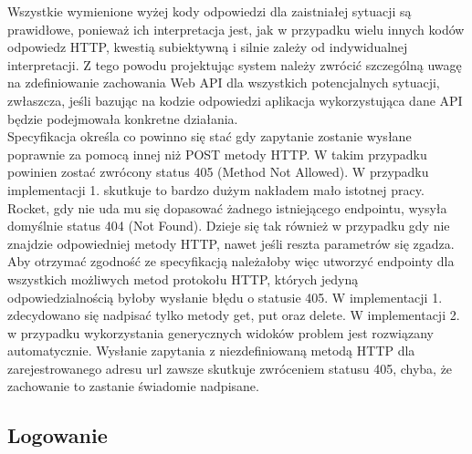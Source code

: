 \documentclass[12pt, notitlepage]{article}
\begin{document}
Wszystkie wymienione wyżej kody odpowiedzi dla zaistniałej sytuacji są prawidłowe, ponieważ ich interpretacja jest, jak w przypadku wielu innych kodów odpowiedz HTTP, kwestią subiektywną i silnie zależy od indywidualnej interpretacji. Z tego powodu projektując system należy zwrócić szczególną uwagę na zdefiniowanie zachowania Web API dla wszystkich potencjalnych sytuacji, zwłaszcza, jeśli bazując na kodzie odpowiedzi aplikacja wykorzystująca dane API będzie podejmowała konkretne działania. \\
Specyfikacja określa co powinno się stać gdy zapytanie zostanie wysłane poprawnie za pomocą innej niż POST metody HTTP. W takim przypadku powinien zostać zwrócony status 405 (Method Not Allowed). W przypadku implementacji 1. skutkuje to bardzo dużym nakładem mało istotnej pracy. Rocket, gdy nie uda mu się dopasować żadnego istniejącego endpointu, wysyła domyślnie status 404 (Not Found). Dzieje się tak również w przypadku gdy nie znajdzie odpowiedniej metody HTTP, nawet jeśli reszta parametrów się zgadza. Aby otrzymać zgodność ze specyfikacją należałoby więc utworzyć endpointy dla wszystkich możliwych metod protokołu HTTP, których jedyną odpowiedzialnością byłoby wysłanie błędu o statusie 405. W implementacji 1. zdecydowano się nadpisać tylko metody get, put oraz delete.
W implementacji 2. w przypadku wykorzystania generycznych widoków problem jest rozwiązany automatycznie. Wysłanie zapytania z niezdefiniowaną metodą HTTP dla zarejestrowanego adresu url zawsze skutkuje zwróceniem statusu 405, chyba, że zachowanie to zastanie świadomie nadpisane.

\subsection{Logowanie}\label{sec:logowanie}
\end{document}
